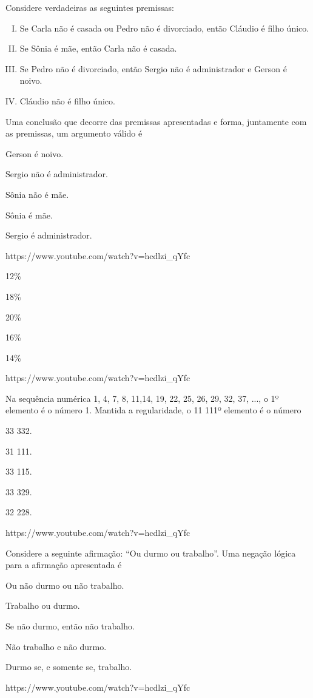 \begin{Large}
\questao{}
{Considere verdadeiras as seguintes premissas:
\begin{enumerate}[I.]
\item Se Carla não é casada ou Pedro não é divorciado, então Cláudio é filho único.
\item Se Sônia é mãe, então Carla não é casada.
\item Se Pedro não é divorciado, então Sergio não é administrador e Gerson é noivo.
\item Cláudio não é filho único.
\end{enumerate}
Uma conclusão que decorre das premissas apresentadas e forma, juntamente com as premissas, um argumento
válido é}
{
\item Gerson é noivo.
\item Sergio não é administrador.
\item Sônia não é mãe.
\item Sônia é mãe.
\item Sergio é administrador.}
{https://www.youtube.com/watch?v=hcdlzi_qYfc}

{
\item 12\%
\item 18\%
\item 20\%
\item 16\%
\item 14\%}
{https://www.youtube.com/watch?v=hcdlzi_qYfc}

\questao{}
{Na sequência numérica 1, 4, 7, 8, 11,14, 19, 22, 25, 26, 29, 32, 37, ..., o 1º elemento é o número 1. Mantida a regularidade, o 11 111º elemento é o número}
{
\item 33 332.
\item 31 111.
\item 33 115.
\item 33 329.
\item 32 228.}
{https://www.youtube.com/watch?v=hcdlzi_qYfc}

\questao{}
{Considere a seguinte afirmação: “Ou durmo ou trabalho”. Uma negação lógica para a afirmação apresentada é}
{
\item Ou não durmo ou não trabalho.
\item Trabalho ou durmo.
\item Se não durmo, então não trabalho.
\item Não trabalho e não durmo.
\item Durmo se, e somente se, trabalho.}
{https://www.youtube.com/watch?v=hcdlzi_qYfc}


\end{Large}
